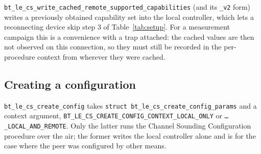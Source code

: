 \documentclass[11pt,a4paper]{article}
\newcommand{\code}[1]{\texttt{\small #1}}
\begin{document}
\code{bt\_\allowbreak{}le\_\allowbreak{}cs\_\allowbreak{}write\_\allowbreak{}cached\_\allowbreak{}remote\_\allowbreak{}supported\_\allowbreak{}capabilities} (and its \code{\_\allowbreak{}v2}
form) writes a previously obtained capability set into the local controller, which lets a
reconnecting device skip step 3 of Table~\ref{tab:setup}. For a measurement campaign this is a
convenience with a trap attached: the cached values are then not observed on this connection, so
they must still be recorded in the per-procedure context from wherever they were cached.

\subsection{Creating a configuration}
\label{sec:createcfg}

\code{bt\_\allowbreak{}le\_\allowbreak{}cs\_\allowbreak{}create\_\allowbreak{}config} takes \code{struct bt\_\allowbreak{}le\_\allowbreak{}cs\_\allowbreak{}create\_\allowbreak{}config\_\allowbreak{}params}
and a context argument, \code{BT\_\allowbreak{}LE\_\allowbreak{}CS\_\allowbreak{}CREATE\_\allowbreak{}CONFIG\_\allowbreak{}CONTEXT\_\allowbreak{}LOCAL\_\allowbreak{}ONLY} or
\code{\ldots\_\allowbreak{}LOCAL\_\allowbreak{}AND\_\allowbreak{}REMOTE}. Only the latter runs the Channel Sounding Configuration
procedure over the air; the former writes the local controller alone and is for the case where the
peer was configured by other means.
\end{document}
